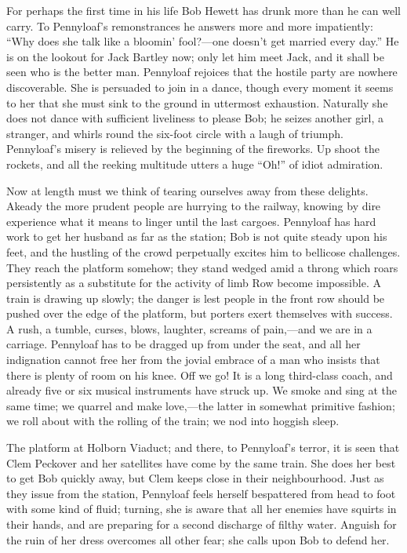 For perhaps the first time in his life Bob Hewett has drunk more than he
can well carry. To Pennyloaf's remonstrances he answers more and more
impatiently: ``Why does she talk like a bloomin' fool?---one doesn't get
married every day.'' He is on the {}lookout for Jack Bartley now; only
let him meet Jack, and it shall be seen who is the better man. Pennyloaf
rejoices that the hostile party are nowhere discoverable. She is
persuaded to join in a dance, though every moment it seems to her that
she must sink to the ground in uttermost exhaustion. Naturally she does
not dance with sufficient liveliness to please Bob; he seizes another
girl, a stranger, and whirls round the six-foot circle with a laugh of
triumph. Pennyloaf's misery is relieved by the beginning of the
fireworks. Up shoot the rockets, and all the reeking multitude utters a
huge ``Oh!'' of idiot admiration.

Now at length must we think of tearing ourselves away from these
delights. Akeady the more prudent people are hurrying to the railway,
knowing by dire experience what it means to linger until the last
cargoes. Pennyloaf has hard work to get her husband as far as the
station; Bob is not quite steady upon his feet, and the hustling of the
crowd perpetually excites him to bellicose challenges. {}They reach the
platform somehow; they stand wedged amid a throng which roars
persistently as a substitute for the activity of limb Row become
impossible. A train is drawing up slowly; the danger is lest people in
the front row should be pushed over the edge of the platform, but
porters exert themselves with success. A rush, a tumble, curses, blows,
laughter, screams of pain,---and we are in a carriage. Pennyloaf has to
be dragged up from under the seat, and all her indignation cannot free
her from the jovial embrace of a man who insists that there is plenty of
room on his knee. Off we go! It is a long third-class coach, and already
five or six musical instruments have struck up. We smoke and sing at the
same time; we quarrel and make love,---the latter in somewhat primitive
fashion; we roll about with the rolling of the train; we nod into
hoggish sleep.

The platform at Holborn Viaduct; and there, to Pennyloaf's terror, it is
seen that Clem Peckover and her satellites have come {}by the same
train. She does her best to get Bob quickly away, but Clem keeps close
in their neighbourhood. Just as they issue from the station, Pennyloaf
feels herself bespattered from head to foot with some kind of fluid;
turning, she is aware that all her enemies have squirts in their hands,
and are preparing for a second discharge of filthy water. Anguish for
the ruin of her dress overcomes all other fear; she calls upon Bob to
defend her.

